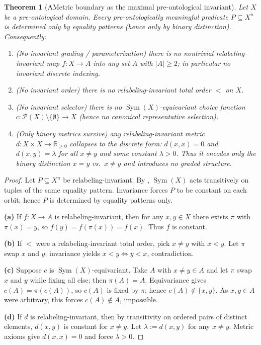 \documentclass[11pt]{article}
\newtheorem{theorem}{Theorem}[section]
\theoremstyle{definition}
\begin{document}
\begin{theorem}[AMetric boundary as the maximal pre-ontological invariant]
\label{thm:ametric-from-distinction}
Let $X$ be a pre-ontological domain.
Every pre-ontologically meaningful predicate $P\subseteq X^n$ is determined \emph{only} by equality patterns
(hence only by binary distinction).
Consequently:
\begin{enumerate}[label=\textbf{(\alph*)}, leftmargin=2.6em]
\item (\emph{No invariant grading / parameterization}) there is no nontrivial relabeling-invariant map $f:X\to A$
into any set $A$ with $|A|\ge 2$; in particular no invariant discrete indexing.
\item (\emph{No invariant order}) there is no relabeling-invariant total order $<$ on $X$.
\item (\emph{No invariant selector}) there is no $\operatorname{Sym}(X)$-equivariant choice function
$c:\mathcal P(X)\setminus\{\emptyset\}\to X$ (hence no canonical representative selection).
\item (\emph{Only binary metrics survive}) any relabeling-invariant metric $d:X\times X\to\mathbb R_{\ge 0}$
collapses to the discrete form: $d(x,x)=0$ and $d(x,y)=\lambda$ for all $x\neq y$ and some constant $\lambda>0$.
Thus it encodes only the binary distinction $x=y$ vs.\ $x\neq y$ and introduces no graded structure.
\end{enumerate}
\end{theorem}

\begin{proof}
Let $P\subseteq X^n$ be relabeling-invariant.
By , $\operatorname{Sym}(X)$ acts transitively on tuples of the same equality pattern.
Invariance forces $P$ to be constant on each orbit; hence $P$ is determined by equality patterns only.

\medskip\noindent\textbf{(a)}
If $f:X\to A$ is relabeling-invariant, then for any $x,y\in X$ there exists $\pi$ with $\pi(x)=y$, so
$f(y)=f(\pi(x))=f(x)$.
Thus $f$ is constant.

\medskip\noindent\textbf{(b)}
If $<$ were a relabeling-invariant total order, pick $x\neq y$ with $x<y$.
Let $\pi$ swap $x$ and $y$; invariance yields $x<y \iff y<x$, contradiction.

\medskip\noindent\textbf{(c)}
Suppose $c$ is $\operatorname{Sym}(X)$-equivariant.
Take $A$ with $x\neq y\in A$ and let $\pi$ swap $x$ and $y$ while fixing all else; then $\pi(A)=A$.
Equivariance gives $c(A)=\pi(c(A))$, so $c(A)$ is fixed by $\pi$; hence $c(A)\notin\{x,y\}$.
As $x,y\in A$ were arbitrary, this forces $c(A)\notin A$, impossible.

\medskip\noindent\textbf{(d)}
If $d$ is relabeling-invariant, then by transitivity on ordered pairs of distinct elements, $d(x,y)$ is constant for $x\neq y$.
Let $\lambda:=d(x,y)$ for any $x\neq y$.
Metric axioms give $d(x,x)=0$ and force $\lambda>0$.
\end{proof}
\end{document}
